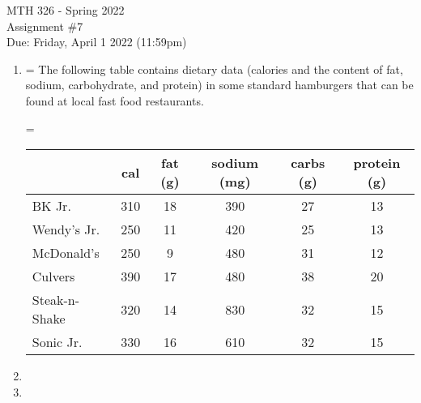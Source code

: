 \documentclass[12pt]{article}
\makeatletter
\newcommand*\notab[1]{%
  \begingroup   %
    \par        %
    \@totalleftmargin=0pt \linewidth=\columnwidth
    \parshape 0
    #1\par      %
  \endgroup
}
\makeatother
\begin{document}
\pagestyle{fancy}
\fancyhf{}

\noindent MTH 326 - Spring 2022
\\Assignment \#7
\\Due: Friday, April 1 2022 (11:59pm)

\begin{enumerate}
    \item 
    \newpage
    \notab{The following table contains dietary data (calories and the content of fat, sodium, carbohydrate, and protein) in some standard hamburgers that can be found at local fast food
    restaurants.}
    \notab{\begin{center}
        \begin{tabular}{|l|c|c|c|c|c|} 
             \hline
             & cal & fat (g) & sodium (mg) & carbs (g) & protein (g)\\
             \hline
             BK Jr. & 310 & 18 & 390 & 27 & 13\\
             Wendy's Jr. & 250 & 11 & 420 & 25 & 13\\
             McDonald's & 250 & 9 & 480 & 31 & 12\\
             Culvers & 390 & 17 & 480 & 38 & 20\\
             Steak-n-Shake & 320 & 14 & 830 & 32 & 15\\
             Sonic Jr. & 330 & 16 & 610 & 32 & 15\\
             \hline
        \end{tabular}
    \end{center}}

    \item 
    \newpage
    \item 
    \end{enumerate}
\end{document}
